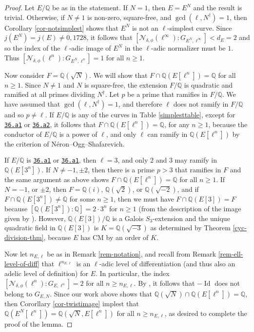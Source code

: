 \documentclass[11pt]{amsart}
\theoremstyle{definition}
\newcommand{\Q}{\mathbb{Q}}
\newcommand{\eclabel}[1]{\href{https://www.lmfdb.org/EllipticCurve/Q/#1}{\texttt{#1}}}
\begin{document}
\begin{proof}
Let $E/\Q$ be as in the statement. If $N = 1$, then $E = E^N$ and the result is trivial. Otherwise, if $N\neq 1$ is non-zero, square-free,  and $\gcd(\ell,N^\dagger)=1$, then Corollary \ref{cor-notsimplest} shows that $E^N$ is not an $\ell$-simplest curve. Since $j(E^N)=j(E)\neq 0,1728$, it follows that  $[\mathcal{N}_{\delta, \phi}(\ell^{\infty}) : G_{E^N, \ell^{\infty}}] < d_E=2$ and so the index of the  $\ell$-adic image of $E^N$ in the $\ell$-adic normalizer must be $1$. Thus $[\mathcal{N}_{\delta, \phi}(\ell^n) : G_{E^N, \ell^n}]=1$ for all $n\geq 1$. 

Now consider $F=\Q(\sqrt{N})$. We will show that $F\cap \Q(E[\ell^n])=\Q$ for all $n\geq 1$. Since $N\neq 1$ and $N$ is square-free, the extension $F/\Q$ is quadratic and ramified at all primes dividing $N^\dagger$. Let $p$ be a prime that ramifies in $F/\Q$. We have assumed that $\gcd(\ell,N^\dagger)=1$, and therefore $\ell$ does not ramify in $F/\Q$ and so $p\neq \ell$. If $E/\Q$ is any of the curves in Table \ref{simplesttable}, except for \eclabel{36.a1} or \eclabel{36.a2}, it follows that $F\cap \Q(E[\ell^n])=\Q$, for any $n\geq 1$, because the conductor of $E/\Q$ is a power of $\ell$, and only $\ell$ can ramify in $\Q(E[\ell^n])$ by the criterion of N\'eron--Ogg--Shafarevich. 

If $E/\Q$ is \eclabel{36.a1} or \eclabel{36.a1}, then $\ell=3$, and only $2$ and $3$ may ramify in $\Q(E[3^n])$. If $N\neq -1,\pm 2$, then there is a prime $p>3$ that ramifies in $F$ and the same argument as above shows $F\cap \Q(E[\ell^n])=\Q$ for all $n\geq 1$. If $N= -1$, or $\pm 2$, then $F=\Q(i)$, $\Q(\sqrt{2})$, or $\Q(\sqrt{- 2})$, and if $F\cap \Q(E[3^n])\neq \Q$ for some $n\geq 1$, then we must have $F\cap \Q(E[3])=F$ because $[\Q(E[3^{n}]):\Q]=2\cdot 3^n$ for $n\geq 1$ (from the description of the image given by \cite[Table 4]{modelspaper}). However, $\Q(E[3])/\Q$ is a Galois $S_3$-extension and the unique quadratic field in $\Q(E[3])$ is $K=\Q(\sqrt{-3})$ as determined by Theorem \ref{cyc-division-thm}, because $E$ has CM by an order of $K$.

Now let $n_{E,\ell}$ be as in Remark \ref{rem-notation}, and recall from Remark \ref{rem-ell-level-of-diff} that $\ell^{n_{E,\ell}}$ is an $\ell$-adic level of differentiation (and thus also an adelic level of definition) for $E$. In particular, the index $[\mathcal{N}_{\delta, \phi}(\ell^n) : G_{E, \ell^n}]=2$ for all $n\geq n_{E,\ell}$. By \cite[Cor. 4.2]{lozano-galoiscm}, it follows that $-\operatorname{Id}$ does not belong to $G_{E,N}$. Since our work above shows that $\Q(\sqrt{N})\cap \Q(E[\ell^n])=\Q$, then Cororllary \ref{cor-twistimage} implest that $\Q(E^N[\ell^n])=\Q(\sqrt{N},E[\ell^n])$ for all $n\geq n_{E,\ell}$, as desired to complete the proof of the lemma.
\end{proof}
\end{document}
